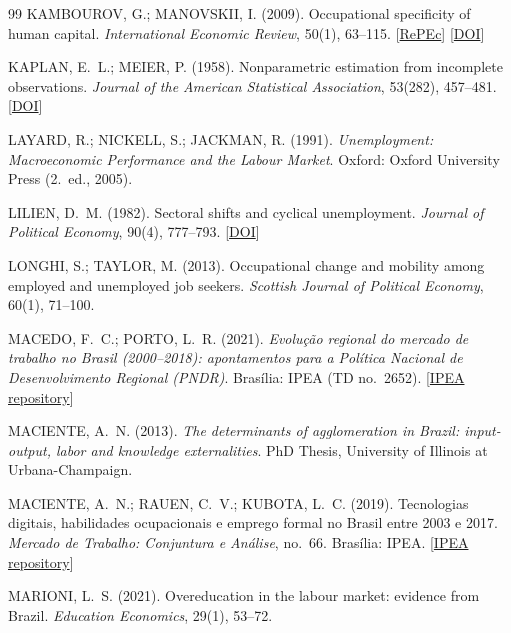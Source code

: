 \documentclass[11pt,a4paper]{article}
\begin{document}
{\begin{thebibliography}{99}
KAMBOUROV, G.; MANOVSKII, I. (2009). Occupational specificity of human capital. \textit{International Economic Review}, 50(1), 63--115. [\href{https://ideas.repec.org/a/ier/iecrev/v50y2009i1p63-115.html}{RePEc}] [\href{https://doi.org/10.1111/j.1468-2354.2008.00524.x}{DOI}]

KAPLAN, E.~L.; MEIER, P. (1958). Nonparametric estimation from incomplete observations. \textit{Journal of the American Statistical Association}, 53(282), 457--481. [\href{https://doi.org/10.1080/01621459.1958.10501452}{DOI}]

LAYARD, R.; NICKELL, S.; JACKMAN, R. (1991). \textit{Unemployment: Macroeconomic Performance and the Labour Market}. Oxford: Oxford University Press (2.~ed., 2005).

LILIEN, D.~M. (1982). Sectoral shifts and cyclical unemployment. \textit{Journal of Political Economy}, 90(4), 777--793. [\href{https://www.journals.uchicago.edu/doi/10.1086/261088}{DOI}]

LONGHI, S.; TAYLOR, M. (2013). Occupational change and mobility among employed and unemployed job seekers. \textit{Scottish Journal of Political Economy}, 60(1), 71--100.

MACEDO, F.~C.; PORTO, L.~R. (2021). \textit{Evolu\c{c}\~ao regional do mercado de trabalho no Brasil (2000--2018): apontamentos para a Pol\'itica Nacional de Desenvolvimento Regional (PNDR)}. Bras\'ilia: IPEA (TD no.~2652). [\href{https://repositorio.ipea.gov.br/bitstream/11058/10570/1/td_2652.pdf}{IPEA repository}]

MACIENTE, A.~N. (2013). \textit{The determinants of agglomeration in Brazil: input-output, labor and knowledge externalities}. PhD Thesis, University of Illinois at Urbana-Champaign.

MACIENTE, A.~N.; RAUEN, C.~V.; KUBOTA, L.~C. (2019). Tecnologias digitais, habilidades ocupacionais e emprego formal no Brasil entre 2003 e 2017. \textit{Mercado de Trabalho: Conjuntura e An\'alise}, no.~66. Bras\'ilia: IPEA. [\href{https://repositorio.ipea.gov.br/bitstream/11058/10274/10/bmt_66_tecnologias_digitais.pdf}{IPEA repository}]

MARIONI, L.~S. (2021). Overeducation in the labour market: evidence from Brazil. \textit{Education Economics}, 29(1), 53--72.


\end{thebibliography}}
\end{document}
